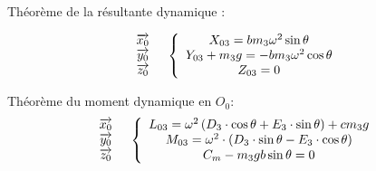 \begin{multicols}{2}
Théorème de la résultante dynamique : 

$$
\begin{array}{cc}
\begin{array}{c}
\overrightarrow{x_0}\\
\overrightarrow{y_0}\\
\overrightarrow{z_0}
\end{array}
&
\left\{
\begin{array}{c}
X_{03}=b m_3 \omega^2\sin\theta\\
Y_{03}+m_3 g=-b m_3 \omega^2\cos\theta\\
Z_{03}=0
\end{array}
\right.
\end{array}
$$

Théorème du moment dynamique en $O_0$: 
$$
\begin{array}{cc}
\begin{array}{c}
\overrightarrow{x_0}\\
\overrightarrow{y_0}\\
\overrightarrow{z_0}
\end{array}
&
\left\{
\begin{array}{c}
L_{03}=\omega^2 \left(D_3\cdot\cos\theta+E_3\cdot\sin\theta\right)+c m_3 g\\
M_{03}=\omega^2\cdot\left(D_3\cdot\sin\theta-E_3\cdot\cos\theta\right)\\
C_m-m_3 g b\sin\theta=0
\end{array}
\right.
\end{array}
$$
\end{multicols}



